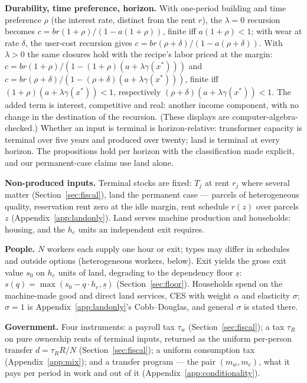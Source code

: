 \documentclass[12pt]{article}
\theoremstyle{plain}
\begin{document}
\textbf{Durability, time preference, horizon.} With one-period building and time preference $\rho$ (the interest rate, distinct from the rent $r$), the $\lambda = 0$ recursion becomes $c = br(1+\rho )/(1 - a(1+\rho ))$, finite iff $a(1+\rho ) < 1$; with wear at rate $\delta$, the user-cost recursion gives $c = br(\rho +\delta )/(1 - a(\rho +\delta ))$. With $\lambda > 0$ the same closures hold with the recipe's labor priced at the margin: $c = br(1+\rho )/(1 - (1+\rho )(a + \lambda \gamma (x^*)))$ and $c = br(\rho +\delta )/(1 - (\rho +\delta )(a + \lambda \gamma (x^*)))$, finite iff $(1+\rho )(a + \lambda \gamma (x^*)) < 1$, respectively $(\rho +\delta )(a + \lambda \gamma (x^*)) < 1$. The added term is interest, competitive and real: another income component, with no change in the destination of the recursion. (These displays are computer-algebra-checked.) Whether an input is terminal is horizon-relative: transformer capacity is terminal over five years and produced over twenty; land is terminal at every horizon. The propositions hold per horizon with the classification made explicit, and our permanent-case claims use land alone.

\textbf{Non-produced inputs.} Terminal stocks are fixed: $T_j$ at rent $r_j$ where several matter (Section~\ref{sec:fiscal}), land the permanent case --- parcels of heterogeneous quality, reservation rent zero at the idle margin, rent schedule $r(z)$ over parcels $z$ (Appendix~\ref{app:landonly}). Land serves machine production and households: housing, and the $h_e$ units an independent exit requires.

\textbf{People.} $N$ workers each supply one hour or exit; types may differ in schedules and outside options (heterogeneous workers, below). Exit yields the gross exit value $s_0$ on $h_e$ units of land, degrading to the dependency floor $\underline{s}$: $s(q) = \max(s_0 - q\cdot h_e, \underline{s})$ (Section~\ref{sec:floor}). Households spend on the machine-made good and direct land services, CES with weight $\alpha$ and elasticity $\sigma$; $\sigma = 1$ is Appendix~\ref{app:landonly}'s Cobb--Douglas, and general $\sigma$ is stated there.

\textbf{Government.} Four instruments: a payroll tax $\tau _w$ (Section~\ref{sec:fiscal}); a tax $\tau _R$ on pure ownership rents of terminal inputs, returned as the uniform per-person transfer $d = \tau _R R/N$ (Section~\ref{sec:fiscal}); a uniform consumption tax (Appendix~\ref{app:mix}); and a transfer program --- the pair $(m_w,m_e)$, what it pays per period in work and out of it (Appendix~\ref{app:conditionality}).
\end{document}
